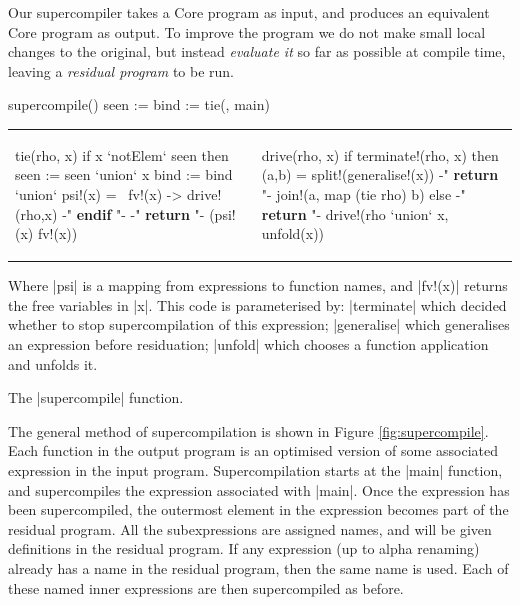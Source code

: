 Our supercompiler takes a Core program as input, and produces an equivalent Core program as output. To improve the program we do not make small local changes to the original, but instead \textit{evaluate it} so far as possible at compile time, leaving a \textit{residual program} to be run.

\begin{fig}
\begin{code}
supercompile()
    seen := {}
    bind := {}
    tie({}, main)
\end{code}

\vspace{-6mm}

\begin{tabular}{p{6.9cm}p{5cm}}
\begin{code}
tie(rho, x)
    if x `notElem` seen then
        seen := seen `union` {x}
        bind := bind `union` {psi\!!(x) = \ fv\!!(x) -> drive\!!(rho,x)}
    {-" \textsf{\textbf{endif}} "-}
    {-" \textsf{\textbf{return }} "-} (psi\!!(x) fv\!!(x))
\end{code}
&
\begin{code}
drive(rho, x)
    if terminate\!!(rho, x) then
        (a,b) = split\!!(generalise\!!(x))
        {-" \textsf{\textbf{return }} "-} join\!!(a, map (tie rho) b)
    else
        {-" \textsf{\textbf{return }} "-} drive\!!(rho `union` {x}, unfold(x))
\end{code}
\end{tabular}

\vspace{-3mm}

Where |psi| is a mapping from expressions to function names, and |fv\!!(x)| returns the free variables in |x|. This code is parameterised by: |terminate| which decided whether to stop supercompilation of this expression; |generalise| which generalises an expression before residuation; |unfold| which chooses a function application and unfolds it.
\vspace{3mm}
\figend
\caption{The |supercompile| function.}
\label{fig:supercompile}
\end{fig}

The general method of supercompilation is shown in Figure \ref{fig:supercompile}. Each function in the output program is an optimised version of some associated expression in the input program. Supercompilation starts at the |main| function, and supercompiles the expression associated with |main|. Once the expression has been supercompiled, the outermost element in the expression becomes part of the residual program. All the subexpressions are assigned names, and will be given definitions in the residual program. If any expression (up to alpha renaming) already has a name in the residual program, then the same name is used. Each of these named inner expressions are then supercompiled as before.

